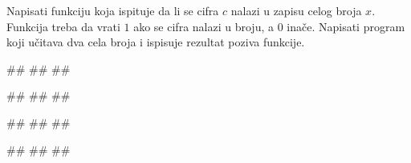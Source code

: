 \begin{Exercise}[label=v1.4_09] 
Napisati funkciju  koja ispituje da li
se cifra $c$ nalazi u zapisu celog broja $x$. Funkcija treba da vrati
$1$ ako se cifra nalazi u broju, a $0$ inače. Napisati program koji
učitava dva cela broja i ispisuje rezultat poziva funkcije.

\begin{miditest}
\begin{upotreba}{1}
#\naslovInt#
##
##
\end{upotreba}
\end{miditest}
\begin{miditest}
\begin{upotreba}{2}
#\naslovInt#
##
##
\end{upotreba}
\end{miditest}

\begin{miditest}
\begin{upotreba}{3}
#\naslovInt#
##
##
\end{upotreba}
\end{miditest}
\begin{miditest}
\begin{upotreba}{4}
#\naslovInt#
##
##
\end{upotreba}
\end{miditest}

\end{Exercise}
\ifresenja 
\begin{Answer}[ref=v1.4_09]
\end{Answer} 
\fi


